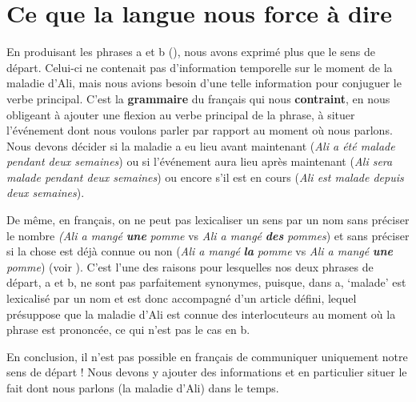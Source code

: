 \section{Ce que la langue nous force à dire}\label{sec:1.2.11}

En produisant les phrases a et b (), nous avons exprimé plus que le sens de départ. Celui-ci ne contenait pas d’information temporelle sur le moment de la maladie d’Ali, mais nous avions besoin d’une telle information pour conjuguer le verbe principal. C’est la \textbf{grammaire} du français qui nous \textbf{contraint}, en nous obligeant à ajouter une flexion au verbe principal de la phrase, à situer l’événement dont nous voulons parler par rapport au moment où nous parlons. Nous devons décider si la maladie a eu lieu avant maintenant (\textit{Ali a été malade pendant deux semaines}) ou si l’événement aura lieu après maintenant (\textit{Ali sera malade pendant deux semaines}) ou encore s’il est en cours (\textit{Ali est malade depuis deux semaines}).

De même, en français, on ne peut pas lexicaliser un sens par un nom sans préciser le nombre \textit{(Ali a mangé} \textbf{\textit{une}} \textit{pomme} vs \textit{Ali a mangé} \textbf{\textit{des}} \textit{pommes}) et sans préciser si la chose est déjà connue ou non (\textit{Ali a mangé} \textbf{\textit{la}} \textit{pomme} vs \textit{Ali a mangé} \textbf{\textit{une}} \textit{pomme}) (voir ). C’est l’une des raisons pour lesquelles nos deux phrases de départ, a et b, ne sont pas parfaitement synonymes, puisque, dans a, ‘malade’ est lexicalisé par un nom et est donc accompagné d’un article défini, lequel présuppose que la maladie d’Ali est connue des interlocuteurs au moment où la phrase est prononcée, ce qui n’est pas le cas en b.

En conclusion, il n’est pas possible en français de communiquer uniquement notre sens de départ ! Nous devons y ajouter des informations et en particulier situer le fait dont nous parlons (la maladie d’Ali) dans le temps.


